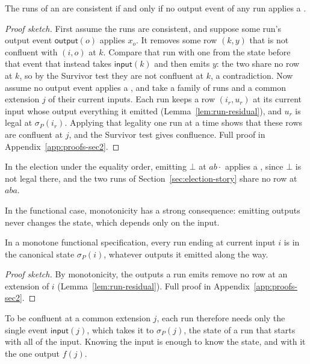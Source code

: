 \begin{lemma}
\label{lem:confluence-legality}
The runs of an \spectype are consistent if and only if no output event of any
run applies a \commitment.
\end{lemma}

\begin{proof}[Proof sketch]
First assume the runs are consistent, and suppose some run's output event
$\mathsf{output}(o)$ applies $x_o$.  It removes some row $(k,y)$ that is not confluent with $(i,o)$ at $k$.  Compare that run with one from the state
before that event that instead takes $\mathsf{input}(k)$ and then emits $y$:
the two share no row at $k$, so by the Survivor test they are not confluent at
$k$, a contradiction.  Now assume no output event applies a \commitment, and
take a family of runs and a common extension $j$ of their current inputs.  Each run keeps a row
$(i_r,u_r)$ at its current input whose output \outrel everything it emitted
(Lemma~\ref{lem:run-residual}), and $u_r$ is legal at $\sigma_P(i_r)$.
Applying that legality one run at a time shows that these rows are confluent at $j$, and the Survivor test gives confluence.  Full proof in
Appendix~\ref{app:proofs-sec2}.
\end{proof}


In the election under the equality order, emitting $\bot$ at $ab\cdot$ applies
a \commitment, since $\bot$ is not legal there, and the two runs of
Section~\ref{sec:election-story} share no row at $aba$.

In the functional case, monotonicity has a strong consequence: emitting outputs
never changes the state, which depends only on the input.

\begin{corollary}
\label{cor:state-by-input}
In a monotone functional specification, every run ending at current
input $i$ is in the canonical state $\sigma_P(i)$, whatever outputs it emitted
along the way.
\end{corollary}

\begin{proof}[Proof sketch]
By monotonicity, the outputs a run emits remove no row at an extension of $i$ (Lemma~\ref{lem:run-residual}).  Full proof in Appendix~\ref{app:proofs-sec2}.
\end{proof}

To be confluent at a common extension $j$, each run therefore needs only the
single event $\mathsf{input}(j)$, which takes it to $\sigma_P(j)$, the state of a
run that starts with all of the input.  Knowing the input is enough to know the state, and with it the one
output $f(j)$.

